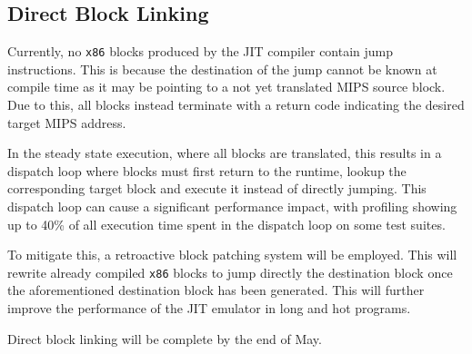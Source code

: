 \subsection{Direct Block Linking}

Currently, no \texttt{x86} blocks produced by the JIT compiler contain jump instructions. This is because the destination of the jump cannot be known at compile time as it may be pointing to a not yet translated MIPS source block. Due to this, all blocks instead terminate with a return code indicating the desired target MIPS address.

In the steady state execution, where all blocks are translated, this results in a dispatch loop where blocks must first return to the runtime, lookup the corresponding target block and execute it instead of directly jumping. This dispatch loop can cause a significant performance impact, with profiling showing up to 40\% of all execution time spent in the dispatch loop on some test suites.

To mitigate this, a retroactive block patching system will be employed. This will rewrite already compiled \texttt{x86} blocks to jump directly the destination block once the aforementioned destination block has been generated. This will further improve the performance of the JIT emulator in long and hot programs.

Direct block linking will be complete by the end of May.